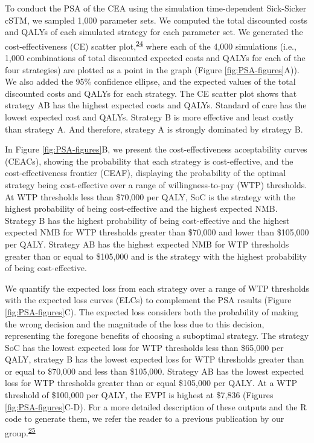 \documentclass[
]{article}
\begin{document}
To conduct the PSA of the CEA using the simulation time-dependent Sick-Sicker cSTM, we sampled 1,000 parameter sets. We computed the total discounted costs and QALYs of each simulated strategy for each parameter set. We generated the cost-effectiveness (CE) scatter plot,\textsuperscript{\protect\hyperlink{ref-Briggs2002}{24}} where each of the 4,000 simulations (i.e., 1,000 combinations of total discounted expected costs and QALYs for each of the four strategies) are plotted as a point in the graph (Figure \ref{fig:PSA-figures}A)). We also added the 95\% confidence ellipse, and the expected values of the total discounted costs and QALYs for each strategy. The CE scatter plot shows that strategy AB has the highest expected costs and QALYs. Standard of care has the lowest expected cost and QALYs. Strategy B is more effective and least costly than strategy A. And therefore, strategy A is strongly dominated by strategy B.

In Figure \ref{fig:PSA-figures}B, we present the cost-effectiveness acceptability curves (CEACs), showing the probability that each strategy is cost-effective, and the cost-effectiveness frontier (CEAF), displaying the probability of the optimal strategy being cost-effective over a range of willingness-to-pay (WTP) thresholds. At WTP thresholds less than \$70,000 per QALY, SoC is the strategy with the highest probability of being cost-effective and the highest expected NMB. Strategy B has the highest probability of being cost-effective and the highest expected NMB for WTP thresholds greater than \$70,000 and lower than \$105,000 per QALY. Strategy AB has the highest expected NMB for WTP thresholds greater than or equal to \$105,000 and is the strategy with the highest probability of being cost-effective.

We quantify the expected loss from each strategy over a range of WTP thresholds with the expected loss curves (ELCs) to complement the PSA results (Figure \ref{fig:PSA-figures}C). The expected loss considers both the probability of making the wrong decision and the magnitude of the loss due to this decision, representing the foregone benefits of choosing a suboptimal strategy. The strategy SoC has the lowest expected loss for WTP thresholds less than \$65,000 per QALY, strategy B has the lowest expected loss for WTP thresholds greater than or equal to \$70,000 and less than \$105,000. Strategy AB has the lowest expected loss for WTP thresholds greater than or equal \$105,000 per QALY. At a WTP threshold of \$100,000 per QALY, the EVPI is highest at \$7,836 (Figures \ref{fig:PSA-figures}C-D). For a more detailed description of these outputs and the R code to generate them, we refer the reader to a previous publication by our group.\textsuperscript{\protect\hyperlink{ref-Alarid-Escudero2019}{25}}
\end{document}

